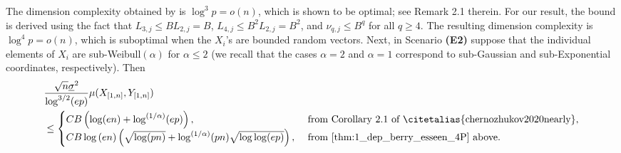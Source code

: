 \documentclass[aos]{imsart}
\begin{document}
The  dimension complexity obtained by  is $\log ^3 p = o(n)$, which is shown to be optimal; see Remark 2.1 therein. For our result, the bound is derived using the fact that $L_{3,j} \leq B L_{2,j} = B$, $L_{4,j} \leq B^2 L_{2,j} = B^2$, and $\nu_{q,j} \leq B^q$ for all $q \geq 4$. %
The resulting dimension complexity is $\log^4 p = o(n)$, which is suboptimal when the $X_i$'s are bounded random vectors. 
Next, in Scenario {\bf (E2)} suppose that the individual elements of $X_i$ are sub-Weibull$(\alpha)$ for $\alpha \leq 2$ (we recall that the cases $\alpha = 2$ and $\alpha = 1$ correspond to sub-Gaussian and sub-Exponential coordinates, respectively). Then
\begin{equation*}
\begin{aligned}
    & \frac{\sqrt{n}\underline{\sigma}^2}{\log^{3/2}(ep)} \mu(X_{[1,n]}, Y_{[1,n]}) \\
    & \leq 
    \begin{cases}
    C B
    \left(
        \log(en) + \log^{(1/\alpha)}(ep)
    \right), 
    & \mbox{ from Corollary 2.1 of \citetalias{chernozhukov2020nearly}},\\
    C B
     \log\left(en\right) 
    \left(\sqrt{\log(pn)} + \log^{(1/\alpha)}(pn) \sqrt{\log\log(ep)} \right), 
    &\mbox{ from \cref{thm:1_dep_berry_esseen_4P} above.}
    \end{cases}
\end{aligned}
\end{equation*}
\end{document}
